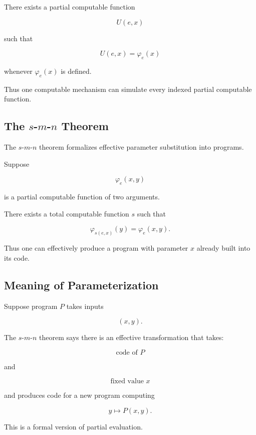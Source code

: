 There exists a partial computable function

\[
\boxed{
U(e,x)
}
\]

such that

\[
\boxed{
U(e,x)
=
\varphi_e(x)
}
\]

whenever \(\varphi_e(x)\) is defined.

Thus one computable mechanism can simulate every indexed partial computable
function.

\subsection{The \(s\)-\(m\)-\(n\) Theorem}
\label{subsec:s-m-n-theorem}

The \(s\)-\(m\)-\(n\) theorem formalizes effective parameter substitution
into programs.

Suppose

\[
\varphi_e(x,y)
\]

is a partial computable function of two arguments.

There exists a total computable function \(s\) such that

\[
\boxed{
\varphi_{s(e,x)}(y)
=
\varphi_e(x,y).
}
\]

Thus one can effectively produce a program with parameter \(x\) already
built into its code.

\subsection{Meaning of Parameterization}
\label{subsec:meaning-s-m-n}

Suppose program \(P\) takes inputs

\[
(x,y).
\]

The \(s\)-\(m\)-\(n\) theorem says there is an effective transformation that
takes:

\[
\boxed{
\text{code of }P
}
\]

and

\[
\boxed{
\text{fixed value }x
}
\]

and produces code for a new program computing

\[
\boxed{
y\mapsto P(x,y).
}
\]

This is a formal version of partial evaluation.

